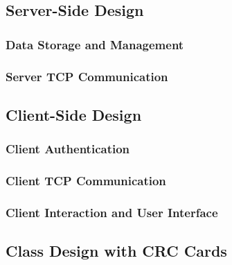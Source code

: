 \subsection{Server-Side Design}
\subsubsection{Data Storage and Management}
\subsubsection{Server TCP Communication}
\subsection{Client-Side Design}
\subsubsection{Client Authentication}
\subsubsection{Client TCP Communication}
\subsubsection{Client Interaction and User Interface}
\subsection{Class Design with CRC Cards}